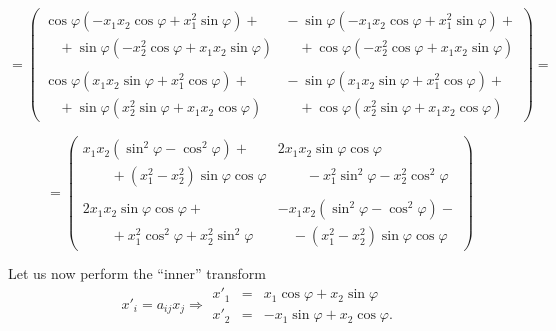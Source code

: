 {$$
  =\left(\!\!\!
    \begin{array}{cc}
      \cos \varphi
        \left(-x_1 x_2 \cos \varphi + x_1^2 \sin \varphi\right)+\!&\!
      -\sin \varphi
        \left(-x_1 x_2 \cos \varphi + x_1^2 \sin \varphi\right)+\\
      \quad +\sin \varphi
        \left(-x_2^2 \cos \varphi + x_1 x_2 \sin \varphi\right)\!&\!
      \quad +\cos \varphi
        \left(-x_2^2 \cos \varphi + x_1 x_2 \sin \varphi\right)\\
      \\[1ex]
      \cos \varphi
        \left(x_1 x_2 \sin \varphi + x_1^2 \cos \varphi\right)+\!&\!
      -\sin \varphi
        \left(x_1 x_2 \sin \varphi + x_1^2 \cos \varphi\right)+\\
      \quad +\sin \varphi
        \left(x_2^2 \sin \varphi + x_1 x_2 \cos \varphi\right)\!&\!
      \quad +\cos \varphi
        \left(x_2^2 \sin \varphi + x_1 x_2 \cos \varphi\right)
    \end{array}
  \!\right)=
$$

\smallskip

$$
  =\left(
    \begin{array}{cc}
      x_1 x_2 \left(\sin^2 \varphi - \cos^2 \varphi \right) + &
      2x_1 x_2 \sin \varphi \cos \varphi \\
      \qquad + \left( x_1^2-x_2^2 \right) \sin \varphi \cos \varphi &
      \qquad - x_1^2 \sin^2 \varphi - x_2^2 \cos^2 \varphi \\
      \\[1ex]
      2x_1 x_2 \sin \varphi \cos \varphi + &
      -x_1 x_2 \left(\sin^2 \varphi - \cos^2 \varphi \right) - \\
      \qquad + x_1^2 \cos^2 \varphi + x_2^2 \sin^2 \varphi &
      \quad -\left(x_1^2-x_2^2\right) \sin \varphi \cos \varphi
    \end{array}
  \right)
$$

Let us now perform the ``inner'' transform
$$
  x'_i =a_{ij}x_j \Longrightarrow
  \begin{array}{rcl}
    x'_1 & = & x_1 \cos \varphi + x_2 \sin \varphi \\
    x'_2 & = & -x_1 \sin \varphi + x_2 \cos \varphi .
  \end{array}
$$

}
